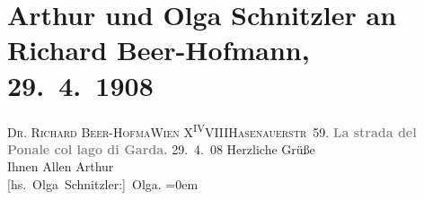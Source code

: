 

         
         \renewcommand{\erwaehntePersonen}{Personen: Richard Beer-Hofmann}
         \renewcommand{\erwaehnteOrte}{Orte: Hasenauerstraße, Lago di Garda, Riva del Garda, Strada del Ponale, Wien, XVIII., Währing}
         \renewcommand{\erwaehnteWerke}{}
               \section[Arthur und Olga Schnitzler an Richard Beer-Hofmann, 29. 4. 1908]{ Arthur und Olga Schnitzler an Richard Beer-Hofmann, 29. 4. 1908}\nopagebreak{}\rehead{ }\begin{ledgroupsized}[t]{13cm}\normalsize\beginnumbering \toendnotes[C]{\smallbreak\pagebreak[2]} 
\pstart{}{\pb}\textsc{Dr. Richard Beer-Hofma{\geminationn}}\pend{}\pstart{}\textsc{Wien}{ }X\substVorne{}\textsuperscript{IV}\substDazwischen{}VIII\substHinten{}\pend{}\pstart{}\textsc{Hasenauerstr 59}.\pend{}{\bigskip}\pstart
           \noindent{}\centering{}{\pb}\textcolor{gray}{\textbf{La strada del Ponale col lago di Garda.}}\pend
           \pstart
           \raggedleft{}{\pb}29. 4. 08\pend
           \pstart
           Herzliche Grüße{\\}Ihnen Allen\pend
           \pstart
           \spacefill\mbox{Arthur}{\\[\baselineskip]}\spacefill\mbox{{[}hs. Olga Schnitzler:{]} Olga.}\pend
           \leftskip=0em{}
         
         \endnumbering{}\end{ledgroupsized}  \newcommand{\dateiname}{L01768}\newcommand{\titel}{Arthur und Olga Schnitzler an Richard Beer-Hofmann, 29. 4. 1908}\newcommand{\editorInnen}{Martin Anton Müller und Gerd-Hermann Susen}
      